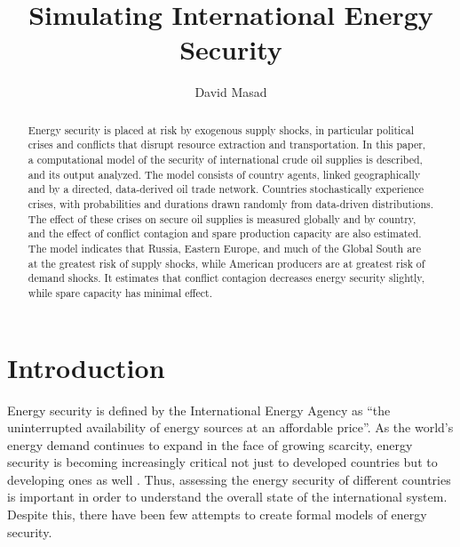 \documentclass{article}
\begin{document}
\title{Simulating International Energy Security}
	\author{David Masad}
	\date{}
	\maketitle


\begin{abstract}
Energy security is placed at risk by exogenous supply shocks, in particular political crises and conflicts that disrupt resource extraction and transportation. In this paper, a computational model of the security of international crude oil supplies is described, and its output analyzed. The model consists of country agents, linked geographically and by a directed, data-derived oil trade network. Countries stochastically experience crises, with probabilities and durations drawn randomly from data-driven distributions. The effect of these crises on secure oil supplies is measured globally and by country, and the effect of conflict contagion and spare production capacity are also estimated. The model indicates that Russia, Eastern Europe, and much of the Global South are at the greatest risk of supply shocks, while American producers are at greatest risk of demand shocks. It estimates that conflict contagion decreases energy security slightly, while spare capacity has minimal effect. 
\end{abstract}

\onehalfspacing

\section{Introduction}

Energy security is defined by the International Energy Agency as ``the uninterrupted availability of energy sources at an affordable price''\citep{iea_2013}. As the world's energy demand continues to expand in the face of growing scarcity, energy security is becoming increasingly critical not just to developed countries but to developing ones as well \citep{yergin_2006}. Thus, assessing the energy security of different countries is important in order to understand the overall state of the international system. Despite this, there have been few attempts to create formal models of energy security. 
\end{document}
